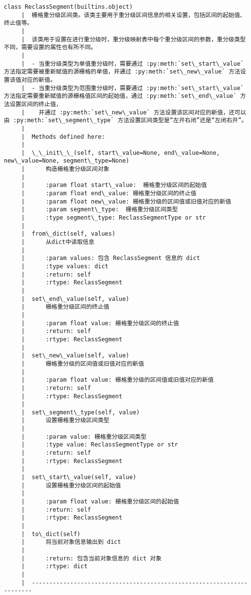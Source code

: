 \documentclass[11pt]{article}
\begin{document}
\begin{Verbatim}[commandchars=\\\{\}]
    class ReclassSegment(builtins.object)
     |  栅格重分级区间类。该类主要用于重分级区间信息的相关设置，包括区间的起始值、终止值等。
     |  
     |  该类用于设置在进行重分级时，重分级映射表中每个重分级区间的参数，重分级类型不同，需要设置的属性也有所不同。
     |  
     |  - 当重分级类型为单值重分级时，需要通过 :py:meth:`set\_start\_value` 方法指定需要被重新赋值的源栅格的单值，并通过 :py:meth:`set\_new\_value` 方法设置该值对应的新值。
     |  - 当重分级类型为范围重分级时，需要通过 :py:meth:`set\_start\_value` 方法指定需要重新赋值的源栅格值区间的起始值，通过 :py:meth:`set\_end\_value` 方法设置区间的终止值，
     |    并通过 :py:meth:`set\_new\_value` 方法设置该区间对应的新值，还可以由 :py:meth:`set\_segment\_type` 方法设置区间类型是“左开右闭”还是“左闭右开”。
     |  
     |  Methods defined here:
     |  
     |  \_\_init\_\_(self, start\_value=None, end\_value=None, new\_value=None, segment\_type=None)
     |      构造栅格重分级区间对象
     |      
     |      :param float start\_value:  栅格重分级区间的起始值
     |      :param float end\_value: 栅格重分级区间的终止值
     |      :param float new\_value: 栅格重分级的区间值或旧值对应的新值
     |      :param segment\_type:  栅格重分级区间类型
     |      :type segment\_type: ReclassSegmentType or str
     |  
     |  from\_dict(self, values)
     |      从dict中读取信息
     |      
     |      :param values: 包含 ReclassSegment 信息的 dict
     |      :type values: dict
     |      :return: self
     |      :rtype: ReclassSegment
     |  
     |  set\_end\_value(self, value)
     |      栅格重分级区间的终止值
     |      
     |      :param float value: 栅格重分级区间的终止值
     |      :return: self
     |      :rtype: ReclassSegment
     |  
     |  set\_new\_value(self, value)
     |      栅格重分级的区间值或旧值对应的新值
     |      
     |      :param float value: 栅格重分级的区间值或旧值对应的新值
     |      :return: self
     |      :rtype: ReclassSegment
     |  
     |  set\_segment\_type(self, value)
     |      设置栅格重分级区间类型
     |      
     |      :param value: 栅格重分级区间类型
     |      :type value: ReclassSegmentType or str
     |      :return: self
     |      :rtype: ReclassSegment
     |  
     |  set\_start\_value(self, value)
     |      设置栅格重分级区间的起始值
     |      
     |      :param float value: 栅格重分级区间的起始值
     |      :return: self
     |      :rtype: ReclassSegment
     |  
     |  to\_dict(self)
     |      将当前对象信息输出到 dict
     |      
     |      :return: 包含当前对象信息的 dict 对象
     |      :rtype: dict
     |  
     |  ----------------------------------------------------------------------

\end{Verbatim}
\end{document}
